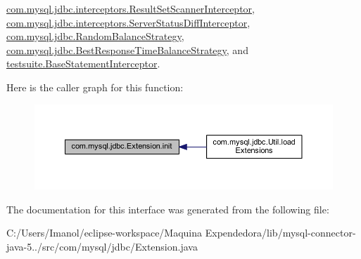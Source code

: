 \mbox{\hyperlink{classcom_1_1mysql_1_1jdbc_1_1interceptors_1_1_result_set_scanner_interceptor_a05bd31d17303e90f2933891426772f11}{com.\+mysql.\+jdbc.\+interceptors.\+Result\+Set\+Scanner\+Interceptor}}, \mbox{\hyperlink{classcom_1_1mysql_1_1jdbc_1_1interceptors_1_1_server_status_diff_interceptor_a3d503667dd4d8f6dcaf6fbf4535bd5bf}{com.\+mysql.\+jdbc.\+interceptors.\+Server\+Status\+Diff\+Interceptor}}, \mbox{\hyperlink{classcom_1_1mysql_1_1jdbc_1_1_random_balance_strategy_a748e276bd760d5671b7d6ee30c9c987f}{com.\+mysql.\+jdbc.\+Random\+Balance\+Strategy}}, \mbox{\hyperlink{classcom_1_1mysql_1_1jdbc_1_1_best_response_time_balance_strategy_ac8018473ac870dfb7c67f51092cd0261}{com.\+mysql.\+jdbc.\+Best\+Response\+Time\+Balance\+Strategy}}, and \mbox{\hyperlink{classtestsuite_1_1_base_statement_interceptor_a9f780bb34bc2101037455ca81d1c2a16}{testsuite.\+Base\+Statement\+Interceptor}}.

Here is the caller graph for this function\+:
\nopagebreak
\begin{figure}[H]
\begin{center}
\leavevmode
\includegraphics[width=350pt]{interfacecom_1_1mysql_1_1jdbc_1_1_extension_a79427811058193260bd4df0c38414e88_icgraph}
\end{center}
\end{figure}


The documentation for this interface was generated from the following file\+:\begin{DoxyCompactItemize}
\item 
C\+:/\+Users/\+Imanol/eclipse-\/workspace/\+Maquina Expendedora/lib/mysql-\/connector-\/java-\/5../src/com/mysql/jdbc/Extension.\+java\end{DoxyCompactItemize}
